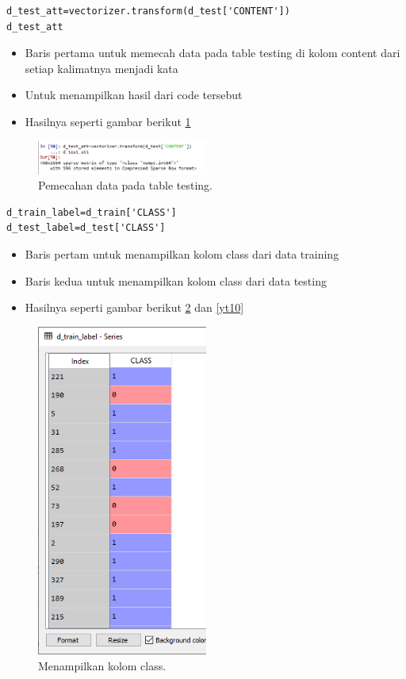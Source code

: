 \begin{enumerate}
\begin{verbatim}
d_test_att=vectorizer.transform(d_test['CONTENT'])
d_test_att
\end{verbatim}
\begin{itemize}
\item Baris pertama untuk memecah data pada table testing di kolom content dari setiap kalimatnya menjadi kata
\item Untuk menampilkan hasil dari code tersebut
\item Hasilnya seperti gambar berikut \ref{yt8}
\end{itemize}
		\begin{figure}[ht]
		\centerline{\includegraphics[width=0.5\textwidth]{figures/im/yt8.png}}
		\caption{Pemecahan data pada table testing.}
		\label{yt8}
		\end{figure}

\begin{verbatim}
d_train_label=d_train['CLASS']
d_test_label=d_test['CLASS']
\end{verbatim}
\begin{itemize}
\item Baris pertam untuk menampilkan kolom class dari data training
\item Baris kedua untuk menampilkan kolom class dari data testing
\item Hasilnya seperti gambar berikut \ref{yt9} dan \ref{yt10}
\end{itemize}
		\begin{figure}[ht]
		\centerline{\includegraphics[width=0.5\textwidth]{figures/im/yt9.png}}
		\caption{Menampilkan kolom class.}
		\label{yt9}
		\end{figure}


\end{enumerate}
